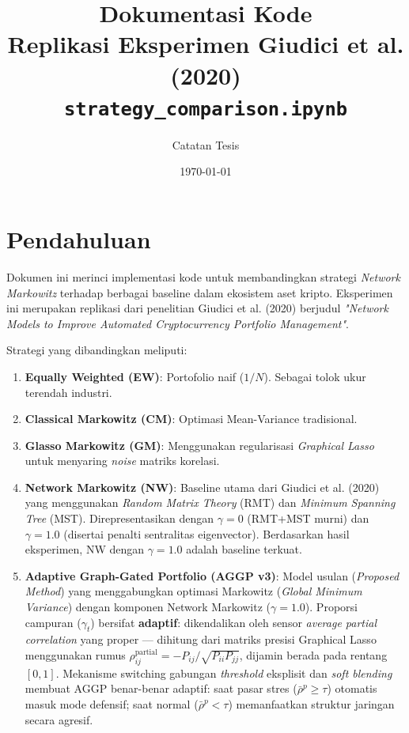 \documentclass[12pt,a4paper]{article}
\title{\textbf{Dokumentasi Kode} \\ \large Replikasi Eksperimen Giudici et al. (2020) \\
\small \texttt{strategy\_comparison.ipynb}}
\author{Catatan Tesis}
\date{\today}
\begin{document}
\maketitle
\tableofcontents
\newpage

\section{Pendahuluan}
Dokumen ini merinci implementasi kode untuk membandingkan strategi \textit{Network Markowitz} terhadap berbagai baseline dalam ekosistem aset kripto. Eksperimen ini merupakan replikasi dari penelitian Giudici et al. (2020) berjudul \textit{"Network Models to Improve Automated Cryptocurrency Portfolio Management"}.

Strategi yang dibandingkan meliputi:
\begin{enumerate}
    \item \textbf{Equally Weighted (EW)}: Portofolio naif ($1/N$). Sebagai tolok ukur terendah industri.
    \item \textbf{Classical Markowitz (CM)}: Optimasi Mean-Variance tradisional.
    \item \textbf{Glasso Markowitz (GM)}: Menggunakan regularisasi \textit{Graphical Lasso} untuk menyaring \textit{noise} matriks korelasi.
    \item \textbf{Network Markowitz (NW)}: Baseline utama dari Giudici et al. (2020) yang menggunakan \textit{Random Matrix Theory} (RMT) dan \textit{Minimum Spanning Tree} (MST). Direpresentasikan dengan $\gamma=0$ (RMT+MST murni) dan $\gamma=1.0$ (disertai penalti sentralitas eigenvector). Berdasarkan hasil eksperimen, NW dengan $\gamma=1.0$ adalah baseline terkuat.
    \item \textbf{Adaptive Graph-Gated Portfolio (AGGP v3)}: Model usulan (\textit{Proposed Method}) yang menggabungkan optimasi Markowitz (\textit{Global Minimum Variance}) dengan komponen Network Markowitz ($\gamma=1.0$). Proporsi campuran ($\gamma_t$) bersifat \textbf{adaptif}: dikendalikan oleh sensor \textit{average partial correlation} yang proper --- dihitung dari matriks presisi Graphical Lasso menggunakan rumus $\rho^{\text{partial}}_{ij} = -P_{ij}/\sqrt{P_{ii} P_{jj}}$, dijamin berada pada rentang $[0,1]$. Mekanisme switching gabungan \textit{threshold} eksplisit dan \textit{soft blending} membuat AGGP benar-benar adaptif: saat pasar stres ($\bar{\rho}^{p} \geq \tau$) otomatis masuk mode defensif; saat normal ($\bar{\rho}^{p} < \tau$) memanfaatkan struktur jaringan secara agresif.
\end{enumerate}
\end{document}
